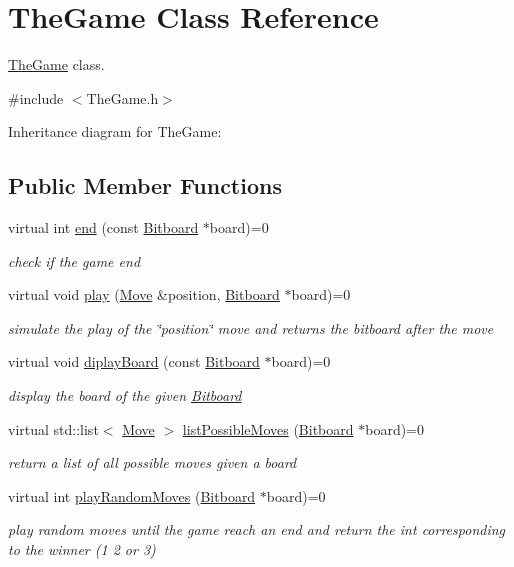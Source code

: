 \hypertarget{class_the_game}{\section{The\+Game Class Reference}
\label{class_the_game}
}


\hyperlink{class_the_game}{The\+Game} class.  




{\ttfamily \#include $<$The\+Game.\+h$>$}



Inheritance diagram for The\+Game\+:
\subsection*{Public Member Functions}
\begin{DoxyCompactItemize}
\item 
virtual int \hyperlink{class_the_game_ae62d35350d5c672741da5fe906a694c2}{end} (const \hyperlink{class_bitboard}{Bitboard} $\ast$board)=0
\begin{DoxyCompactList}\small\item\em check if the game end \end{DoxyCompactList}\item 
virtual void \hyperlink{class_the_game_acffc7663c19496f7fb60aa70f662a994}{play} (\hyperlink{class_move}{Move} \&position, \hyperlink{class_bitboard}{Bitboard} $\ast$board)=0
\begin{DoxyCompactList}\small\item\em simulate the play of the \char`\"{}position\char`\"{} move and returns the bitboard after the move \end{DoxyCompactList}\item 
virtual void \hyperlink{class_the_game_adc3bfc978208321cb3dde8a4e8104b2c}{diplay\+Board} (const \hyperlink{class_bitboard}{Bitboard} $\ast$board)=0
\begin{DoxyCompactList}\small\item\em display the board of the given \hyperlink{class_bitboard}{Bitboard} \end{DoxyCompactList}\item 
virtual std\+::list$<$ \hyperlink{class_move}{Move} $>$ \hyperlink{class_the_game_a8f92221b46530624a0d8c5c46545841e}{list\+Possible\+Moves} (\hyperlink{class_bitboard}{Bitboard} $\ast$board)=0
\begin{DoxyCompactList}\small\item\em return a list of all possible moves given a board \end{DoxyCompactList}\item 
virtual int \hyperlink{class_the_game_a9ce50c12668428017a01bd479fe3dba1}{play\+Random\+Moves} (\hyperlink{class_bitboard}{Bitboard} $\ast$board)=0
\begin{DoxyCompactList}\small\item\em play random moves until the game reach an end and return the int corresponding to the winner (1 2 or 3) \end{DoxyCompactList}\end{DoxyCompactItemize}


